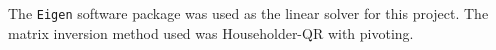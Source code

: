 \documentclass[a4paper, 12pt]{article}
\begin{document}
The \texttt{Eigen} software package
was used as the linear solver for this project. 
The matrix inversion method used was Householder-QR with pivoting.

\begin{comment}
\newpage
\appendix
\section{Source Code and Headers} \label{sec:code}

\subsection{fea\_hw1.cpp} \label{subsec:fea_hw1.cpp}


\subsection{driver.cpp} \label{subsec:driver.cpp}

\subsection{driver.hpp} \label{subsec:driver.hpp}


\subsection{element1D.cpp} \label{subsec:element1D.cpp}

\subsection{element1D.hpp} \label{subsec:element1D.hpp}


\subsection{errorCalcs.cpp} \label{subsec:errorCalcs.cpp}

\subsection{errorCalcs.hpp} \label{subsec:errorCalcs.hpp}



\end{comment}
\end{document}
